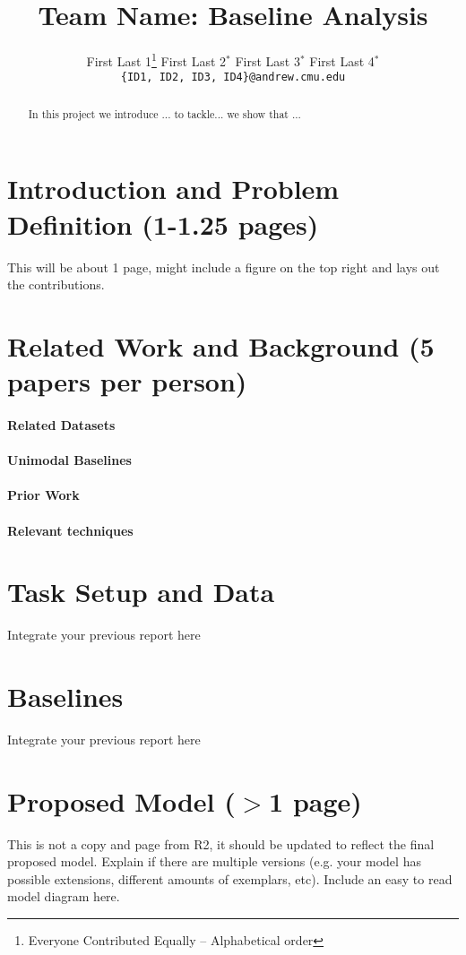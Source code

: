 \documentclass{article} %
\title{Team Name: Baseline Analysis}
\author{
  First Last 1\thanks{\hspace{4pt}Everyone Contributed Equally -- Alphabetical order} \hspace{2em} First Last 2$^*$ \hspace{2em} First Last 3$^*$ \hspace{2em} First Last 4$^*$ \\
  \texttt{\{ID1, ID2, ID3, ID4\}@andrew.cmu.edu}
  }
\date{}
\begin{document}
\maketitle

\begin{abstract}
In this project we introduce ... to tackle... we show that ...
\end{abstract}

\section{ Introduction and Problem Definition (1-1.25 pages)}
This will be about 1 page, might include a figure on the top right and lays out the contributions.

\clearpage
\section{ Related Work and Background (5 papers per person)}
\paragraph{Related Datasets} 

\paragraph{Unimodal Baselines}

\paragraph{Prior Work}

\paragraph{Relevant techniques}


\clearpage
\section{ Task Setup and Data}
Integrate your previous report here

\clearpage
\section{ Baselines}
Integrate your previous report here

\clearpage
\section{ Proposed Model ($>$1 page)}
This is not a copy and page from R2, it should be updated to reflect the final proposed model. Explain if there are multiple versions (e.g. your model has possible extensions, different amounts of exemplars, etc).  Include an easy to read model diagram here.
\end{document}
